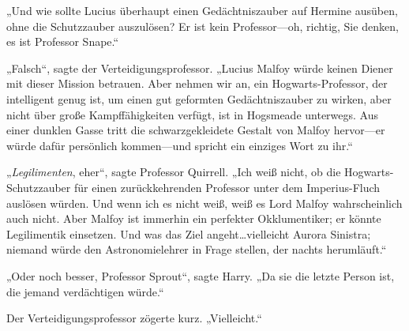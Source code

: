 „Und wie sollte Lucius überhaupt einen Gedächtniszauber auf Hermine ausüben, ohne die Schutzzauber auszulösen? Er ist kein Professor—oh, richtig, Sie denken, es ist Professor Snape.“

„Falsch“, sagte der Verteidigungsprofessor. „Lucius Malfoy würde keinen Diener mit dieser Mission betrauen. Aber nehmen wir an, ein Hogwarts-Professor, der intelligent genug ist, um einen gut geformten Gedächtniszauber zu wirken, aber nicht über große Kampffähigkeiten verfügt, ist in Hogsmeade unterwegs. Aus einer dunklen Gasse tritt die schwarzgekleidete Gestalt von Malfoy hervor—er würde dafür persönlich kommen—und spricht ein einziges Wort zu ihr.“


„\emph{Legilimenten}, eher“, sagte Professor Quirrell. „Ich weiß nicht, ob die Hogwarts-Schutzzauber für einen zurückkehrenden Professor unter dem Imperius-Fluch auslösen würden. Und wenn ich es nicht weiß, weiß es Lord Malfoy wahrscheinlich auch nicht. Aber Malfoy ist immerhin ein perfekter Okklumentiker; er könnte Legilimentik einsetzen. Und was das Ziel angeht…vielleicht Aurora Sinistra; niemand würde den Astronomielehrer in Frage stellen, der nachts herumläuft.“

„Oder noch besser, Professor Sprout“, sagte Harry. „Da sie die letzte Person ist, die jemand verdächtigen würde.“

Der Verteidigungsprofessor zögerte kurz. „Vielleicht.“


